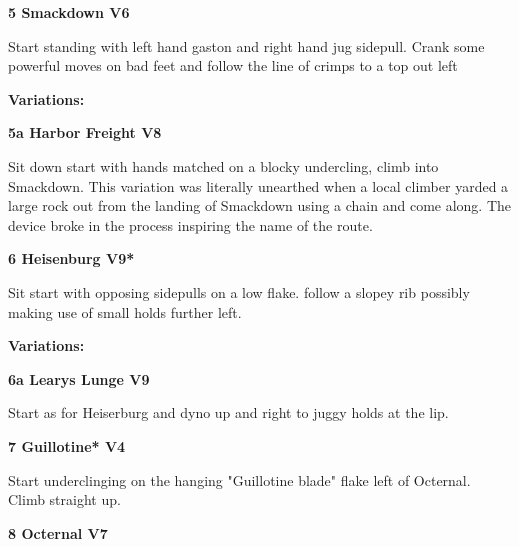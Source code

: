 \begin{multicols}{2}
					\label{rt:Smackdown}
\colorbox{RoyalBlue!20}{
\parbox{0.95\linewidth}{
\textbf{
5 Smackdown V6    
}
}
}

					\begin{adjustwidth}{0.5cm}{}				
					Start standing with left hand gaston and right hand jug sidepull. Crank some powerful moves on bad feet and follow the line of crimps to a top out left
					\end{adjustwidth}
						\begin{adjustwidth}{0.5cm}{}				
						\textbf{Variations:} \newline
							\label{vr:Harbor Freight}
\colorbox{Goldenrod!50}{
\parbox{0.95\linewidth}{
\textbf{
5a Harbor Freight V8     
}
}
}

							\begin{adjustwidth}{0.5cm}{}				
							Sit down start with hands matched on a blocky undercling, climb into Smackdown. This variation was literally unearthed when a local climber yarded a large rock out from the landing of Smackdown using a chain and come along. The device broke in the process inspiring the name of the route.
							\end{adjustwidth}
						\end{adjustwidth}
					\label{rt:Heisenburg}
\colorbox{Goldenrod!50}{
\parbox{0.95\linewidth}{
\textbf{
6 Heisenburg V9*  
}
}
}

					\begin{adjustwidth}{0.5cm}{}				
					Sit start with opposing sidepulls on a low flake. follow a slopey rib possibly making use of small holds further left.
					\end{adjustwidth}
						\begin{adjustwidth}{0.5cm}{}				
						\textbf{Variations:} \newline
							\label{vr:Learys Lunge}
\colorbox{Goldenrod!50}{
\parbox{0.95\linewidth}{
\textbf{
6a Learys Lunge V9     
}
}
}

							\begin{adjustwidth}{0.5cm}{}				
							Start as for Heiserburg and dyno up and right to juggy holds at the lip.
							\end{adjustwidth}
						\end{adjustwidth}
					\label{rt:Guillotine}
\colorbox{RoyalBlue!20}{
\parbox{0.95\linewidth}{
\textbf{
7 Guillotine* V4    
}
}
}

					\begin{adjustwidth}{0.5cm}{}				
					Start underclinging on the hanging "Guillotine blade" flake left of Octernal. Climb straight up.
					\end{adjustwidth}
					\label{rt:Octernal}
\colorbox{Goldenrod!50}{
\parbox{0.95\linewidth}{
\textbf{
8 Octernal V7     
}
}
}


\end{multicols}
